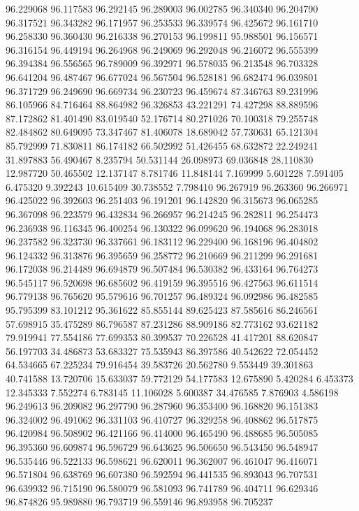 96.229068
96.117583
96.292145
96.289003
96.002785
96.340340
96.204790
96.317521
96.343282
96.171957
96.253533
96.339574
96.425672
96.161710
96.258330
96.360430
96.216338
96.270153
96.199811
95.988501
96.156571
96.316154
96.449194
96.264968
96.249069
96.292048
96.216072
96.555399
96.394384
96.556565
96.789009
96.392971
96.578035
96.213548
96.703328
96.641204
96.487467
96.677024
96.567504
96.528181
96.682474
96.039801
96.371729
96.249690
96.669734
96.230723
96.459674
87.346763
89.231996
86.105966
84.716464
88.864982
96.326853
43.221291
74.427298
88.889596
87.172862
81.401490
83.019540
52.176714
80.271026
70.100318
79.255748
82.484862
80.649095
73.347467
81.406078
18.689042
57.730631
65.121304
85.792999
71.830811
86.174182
66.502992
51.426455
68.632872
22.249241
31.897883
56.490467
8.235794
50.531144
26.098973
69.036848
28.110830
12.987720
50.465502
12.137147
8.781746
11.848144
7.169999
5.601228
7.591405
6.475320
9.392243
10.615409
30.738552
7.798410
96.267919
96.263360
96.266971
96.425022
96.392603
96.251403
96.191201
96.142820
96.315673
96.065285
96.367098
96.223579
96.432834
96.266957
96.214245
96.282811
96.254473
96.236938
96.116345
96.400254
96.130322
96.099620
96.194068
96.283018
96.237582
96.323730
96.337661
96.183112
96.229400
96.168196
96.404802
96.124332
96.313876
96.395659
96.258772
96.210669
96.211299
96.291681
96.172038
96.214489
96.694879
96.507484
96.530382
96.433164
96.764273
96.545117
96.520698
96.685602
96.419159
96.395516
96.427563
96.611514
96.779138
96.765620
95.579616
96.701257
96.489324
96.092986
96.482585
95.795399
83.101212
95.361622
85.855144
89.625423
87.585616
86.246561
57.698915
35.475289
86.796587
87.231286
88.909186
82.773162
93.621182
79.919941
77.554186
77.699353
80.399537
70.226528
41.417201
88.620847
56.197703
34.486873
53.683327
75.535943
86.397586
40.542622
72.054452
64.534665
67.225234
79.916454
39.583726
20.562780
9.553449
39.301863
40.741588
13.720706
15.633037
59.772129
54.177583
12.675890
5.420284
6.453373
12.345333
7.552274
6.783145
11.106028
5.600387
34.476585
7.876903
4.586198
96.249613
96.209082
96.297790
96.287960
96.353400
96.168820
96.151383
96.324002
96.491062
96.331103
96.410727
96.329258
96.408862
96.517875
96.420984
96.508902
96.421166
96.414000
96.465490
96.488685
96.505085
96.395360
96.609874
96.596729
96.643625
96.506650
96.543450
96.548947
96.535446
96.522133
96.598621
96.620011
96.362007
96.461047
96.416071
96.571804
96.638769
96.607380
96.592594
96.441535
96.893043
96.707531
96.639932
96.715190
96.580079
96.581093
96.741789
96.404711
96.629346
96.874826
95.989880
96.793719
96.559146
96.893958
96.705237
